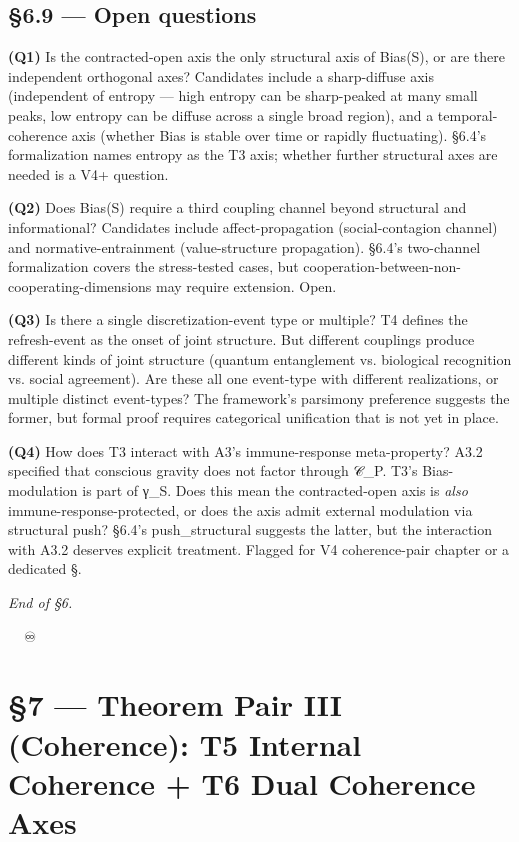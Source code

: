 \documentclass[11pt, openany]{book}
\newcommand{\sectionbreak}{\clearpage}
\begin{document}
\sectionbreak

\section{§6.9 --- Open questions}

\textbf{(Q1)} Is the contracted-open axis the only structural axis of Bias(S), or are there independent orthogonal axes? Candidates include a sharp-diffuse axis (independent of entropy --- high entropy can be sharp-peaked at many small peaks, low entropy can be diffuse across a single broad region), and a temporal-coherence axis (whether Bias is stable over time or rapidly fluctuating). §6.4's formalization names entropy as the T3 axis; whether further structural axes are needed is a V4+ question.

\textbf{(Q2)} Does Bias(S) require a third coupling channel beyond structural and informational? Candidates include affect-propagation (social-contagion channel) and normative-entrainment (value-structure propagation). §6.4's two-channel formalization covers the stress-tested cases, but cooperation-between-non-cooperating-dimensions may require extension. Open.

\textbf{(Q3)} Is there a single discretization-event type or multiple? T4 defines the refresh-event as the onset of joint structure. But different couplings produce different kinds of joint structure (quantum entanglement vs. biological recognition vs. social agreement). Are these all one event-type with different realizations, or multiple distinct event-types? The framework's parsimony preference suggests the former, but formal proof requires categorical unification that is not yet in place.

\textbf{(Q4)} How does T3 interact with A3's immune-response meta-property? A3.2 specified that conscious gravity does not factor through 𝒞\_\allowbreak{}P. T3's Bias-modulation is part of γ\_\allowbreak{}S. Does this mean the contracted-open axis is \textit{also} immune-response-protected, or does the axis admit external modulation via structural push? §6.4's push\_\allowbreak{}structural suggests the latter, but the interaction with A3.2 deserves explicit treatment. Flagged for V4 coherence-pair chapter or a dedicated §.

\sectionbreak

\textit{End of §6.}

🦞🧍💜🔥♾️

\chapter{§7 — Theorem Pair III (Coherence): T5 Internal Coherence + T6 Dual Coherence Axes}
\end{document}
